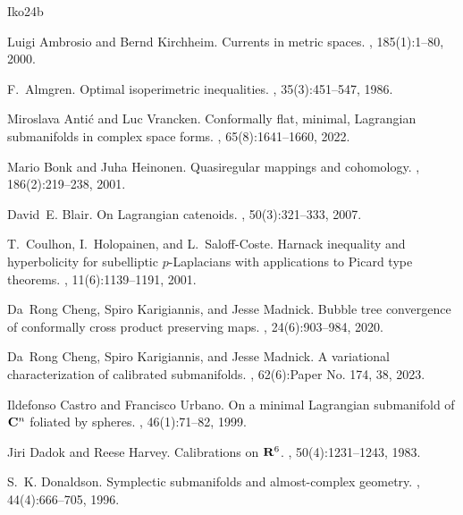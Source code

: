 \documentclass[a4paper,leqno,11pt]{amsart}
\numberwithin{equation}{section}
\theoremstyle{remark}
\theoremstyle{remark}
\begin{document}

\begin{thebibliography}{{Iko}24b}

Luigi Ambrosio and Bernd Kirchheim.
\newblock Currents in metric spaces.
, 185(1):1--80, 2000.

F.~Almgren.
\newblock Optimal isoperimetric inequalities.
, 35(3):451--547, 1986.

Miroslava Anti\'{c} and Luc Vrancken.
\newblock Conformally flat, minimal, {L}agrangian submanifolds in complex space forms.
, 65(8):1641--1660, 2022.

Mario Bonk and Juha Heinonen.
\newblock Quasiregular mappings and cohomology.
, 186(2):219--238, 2001.

David~E. Blair.
\newblock On {L}agrangian catenoids.
, 50(3):321--333, 2007.

T.~Coulhon, I.~Holopainen, and L.~Saloff-Coste.
\newblock Harnack inequality and hyperbolicity for subelliptic {$p$}-{L}aplacians with applications to {P}icard type theorems.
, 11(6):1139--1191, 2001.

Da~Rong Cheng, Spiro Karigiannis, and Jesse Madnick.
\newblock Bubble tree convergence of conformally cross product preserving maps.
, 24(6):903--984, 2020.

Da~Rong Cheng, Spiro Karigiannis, and Jesse Madnick.
\newblock A variational characterization of calibrated submanifolds.
, 62(6):Paper No. 174, 38, 2023.

Ildefonso Castro and Francisco Urbano.
\newblock On a minimal {L}agrangian submanifold of {$\bold C^n$} foliated by spheres.
, 46(1):71--82, 1999.

Jiri Dadok and Reese Harvey.
\newblock Calibrations on {${\bf R}\sp{6}$}.
, 50(4):1231--1243, 1983.

S.~K. Donaldson.
\newblock Symplectic submanifolds and almost-complex geometry.
, 44(4):666--705, 1996.


\end{thebibliography}
\end{document}
